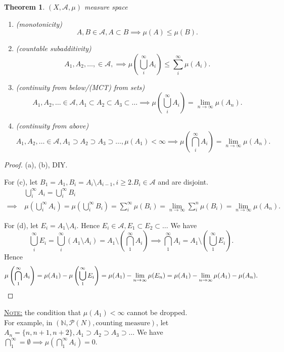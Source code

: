 \documentclass{report}
\newcommand{\N}{\mathbb{N}}
\newcommand{\fancyem}[1]{\underline{\textsc{#1}}}
\newtheorem{theorem}{Theorem}[chapter]
\theoremstyle{definition}
\theoremstyle{remark}
\begin{document}
\setcounter{theorem}{12}
\begin{theorem}
$(X,  \mathcal{A}, \mu)$ measure space
\begin{enumerate}
\item(monotonicity)
\[A, B \in \mathcal{A}, A \subset B \implies \mu(A) \leq \mu(B).\]
\item(countable subadditivity)
	\[A_1, A_2, \ldots, \in \mathcal{A}, \implies \mu\left(\bigcup_i^\infty A_i\right) \leq \sum_i^\infty \mu(A_i).\]
\item(continuity from below/(MCT) from sets)
	\[A_1, A_2, \ldots \in \mathcal{A}, A_1 \subset A_2 \subset A_3 \subset \ldots \implies \mu\left(\bigcup_i^\infty A_i\right) = \lim_{n \to \infty} \mu(A_n).\]
\item(continuity from above)
	\[A_1, A_2, \ldots \in \mathcal{A}, A_1 \supset A_2 \supset A_3 \supset \ldots, \mu(A_1) < \infty \implies \mu\left(\bigcap_i^\infty A_i\right) = \lim_{n \to \infty} \mu(A_n).\]
\end{enumerate}
\end{theorem}
\begin{proof}
    (a), (b), DIY.

    For (c), let $B_1 = A_1, B_i = A_i \setminus A_{i-1}, i \geq 2. B_i \in \mathcal{A}$ and are disjoint.
    \begin{align*}
        & \bigcup_i^\infty A_i = \bigcup_i^\infty B_i \\
        \implies\ & \mu\left(\bigcup_i^\infty A_i\right) = \mu\left(\bigcup_i^\infty B_i\right) = \sum_{i}^\infty \mu(B_i) = \lim_{n \to \infty} \sum_{i}^n \mu(B_i) = \lim_{n \to \infty} \mu(A_n).
    \end{align*}


For (d), let $E_i = A_1 \setminus A_i.$ Hence $E_i \in \mathcal{A}, E_1 \subset E_2 \subset \ldots$
We have
\[
\bigcup_i^\infty E_i = \bigcup_i^\infty (A_1 \setminus A_i) = A_1 \setminus \left(\bigcap_1^\infty A_i\right) \implies \bigcap_1^\infty A_i = A_1 \setminus \left(\bigcup_1^\infty E_i\right).
\]
Hence
\[
\mu\left(\bigcap_1^\infty A_i \right) = \mu(A_1) - \mu\left(\bigcup_1^\infty E_i\right) = \mu(A_1) - \lim_{n\to \infty}\mu(E_n) = \mu(A_1) - \lim_{n\to \infty} \mu(A_1) - \mu(A_n). \qedhere
\]
\end{proof}

\fancyem{Note:} the condition that $\mu(A_1) < \infty$ cannot be dropped. \\
For example,
in $(\N, \mathcal{P}(N), \text{counting measure})$, let $A_n = \{n, n+1, n+2\}, A_1 \supset A_2 \supset A_3 \supset \ldots$ We have $\bigcap_1^\infty = \emptyset \implies \mu\left(\bigcap_1^\infty A_i \right) = 0.$
\end{document}

